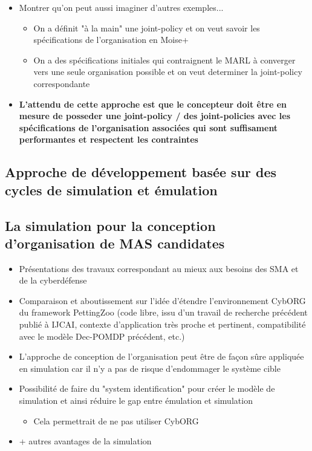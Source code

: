 \documentclass{article}
\begin{document}
\begin{itemize}
\begin{itemize}
\begin{itemize}
                    \end{itemize}
          \end{itemize}
    \item Montrer qu'on peut aussi imaginer d'autres exemples...
          \begin{itemize}
              \item On a définit "à la main" une joint-policy et on veut savoir les spécifications de l'organisation en Moise+
              \item On a des spécifications initiales qui contraignent le MARL à converger vers une seule organisation possible et on veut determiner la joint-policy correspondante
          \end{itemize}
    \item \textbf{L'attendu de cette approche est que le concepteur doit être en mesure de posseder une joint-policy / des joint-policies avec les spécifications de l'organisation associées qui sont suffisament performantes et respectent les contraintes}
\end{itemize}

\subsection{Approche de développement basée sur des cycles de simulation et émulation}

\subsection{La simulation pour la conception d'organisation de MAS candidates}
\begin{itemize}

    \item Présentations des travaux correspondant au mieux aux besoins des SMA et de la cyberdéfense
    \item Comparaison et aboutissement sur l’idée d’étendre l’environnement CybORG du framework PettingZoo (code libre, issu d’un travail de recherche précédent publié à IJCAI, contexte d’application très proche et pertinent, compatibilité avec le modèle Dec-POMDP précédent, etc.)
    \item L'approche de conception de l'organisation peut être de façon sûre appliquée en simulation car il n'y a pas de risque d'endommager le système cible
    \item Possibilité de faire du "system identification" pour créer le modèle de simulation et ainsi réduire le gap entre émulation et simulation
          \begin{itemize}
              \item Cela permettrait de ne pas utiliser CybORG
          \end{itemize}
    \item + autres avantages de la simulation
\end{itemize}
\end{document}
